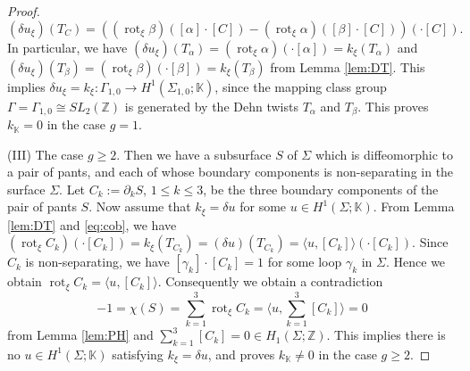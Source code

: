 \documentclass[a4paper,12pt, twoside]{amsart}
\theoremstyle{definition}
\theoremstyle{remark}
\numberwithin{equation}{section}
\newcommand\bK{{\mathbb{K}}}
\newcommand\bZ{{\mathbb{Z}}}
\newcommand\pa{\partial}
\newcommand\rot{\operatorname{rot}}
\begin{document}
\begin{proof}
$$(\delta u_\xi)(T_C) = \left((\rot_\xi\beta)([\alpha]\cdot [C]) - (\rot_\xi\alpha)([\beta]\cdot [C]) \right)(\cdot [C]).
$$
In particular, we have $(\delta u_\xi)(T_\alpha) = (\rot_\xi\alpha)(\cdot [\alpha]) = k_\xi(T_\alpha)$ and $(\delta u_\xi)(T_\beta) = (\rot_\xi\beta)(\cdot [\beta]) = k_\xi(T_\beta)$ from Lemma \ref{lem:DT}. 
This implies $\delta u_\xi = k_\xi: \Gamma_{1,0} \to H^1(\Sigma_{1,0}; \bK)$,  
since the mapping class group $\Gamma = \Gamma_{1,0} \cong SL_2(\bZ)$ is generated by the Dehn twists $T_\alpha$ and $T_\beta$. This proves $k_\bK = 0$ in the case $g=1$. \par
(III) The case $g \geq 2$. Then we have a subsurface $S$ of $\Sigma$ which is diffeomorphic to a pair of pants, and each of whose boundary components is non-separating in the surface $\Sigma$. Let $C_k := \pa_kS$, $1 \leq k \leq 3$, be the three boundary components of the pair of pants $S$. 
Now assume that $k_\xi = \delta u$ for some $u \in H^1(\Sigma; \bK)$. 
From Lemma \ref{lem:DT} and \eqref{eq:cob}, we have $(\rot_\xi C_k)(\cdot [C_k])
= k_\xi(T_{C_k}) = (\delta u)(T_{C_k}) = \langle u, [C_k]\rangle (\cdot [C_k])$. 
Since $C_k$ is non-separating, we have $[\gamma_k]\cdot [C_k] = 1$ for some loop $\gamma_k$ in $\Sigma$. Hence we obtain $\rot_\xi C_k = \langle u, [C_k]\rangle$.
Consequently we obtain a contradiction 
$$
-1 = \chi(S) = {\sum}^3_{k=1}\rot_\xi C_k = \langle u, {\sum}^3_{k=1}[C_k]\rangle = 0
$$
from Lemma \ref{lem:PH} and $\sum^3_{k=1}[C_k] = 0 \in H_1(\Sigma; \bZ)$. 
This implies there is no $u \in H^1(\Sigma; \bK)$ satisfying $k_\xi = \delta u$, and 
proves $k_\bK \not= 0$ in the case $g\geq 2$. 
\end{proof}
\end{document}
